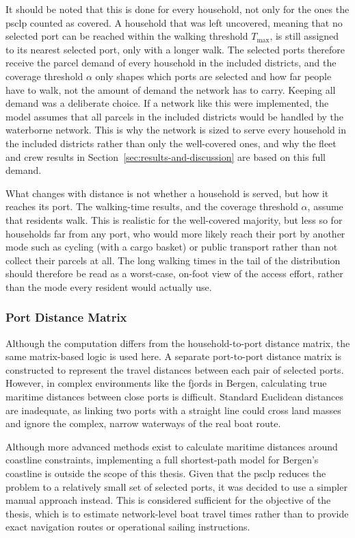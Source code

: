 \documentclass[12pt]{article}
\begin{document}
It should be noted that this is done for every household, not only for the ones the \ac{psclp} counted as covered. A household that was left uncovered, meaning that no selected port can be reached within the walking threshold \(T_{\max}\), is still assigned to its nearest selected port, only with a longer walk. The selected ports therefore receive the parcel demand of every household in the included districts, and the coverage threshold \(\alpha\) only shapes which ports are selected and how far people have to walk, not the amount of demand the network has to carry. Keeping all demand was a deliberate choice. If a network like this were implemented, the model assumes that all parcels in the included districts would be handled by the waterborne network. This is why the network is sized to serve every household in the included districts rather than only the well-covered ones, and why the fleet and crew results in Section~\ref{sec:results-and-discussion} are based on this full demand.

What changes with distance is not whether a household is served, but how it reaches its port. The walking-time results, and the coverage threshold \(\alpha\), assume that residents walk. This is realistic for the well-covered majority, but less so for households far from any port, who would more likely reach their port by another mode such as cycling (with a cargo basket) or public transport rather than not collect their parcels at all. The long walking times in the tail of the distribution should therefore be read as a worst-case, on-foot view of the access effort, rather than the mode every resident would actually use.

\subsubsection{Port Distance Matrix}
\label{subsubsec:port-distance-matrix}

Although the computation differs from the household-to-port distance matrix, the same matrix-based logic is used here. A separate port-to-port distance matrix is constructed to represent the travel distances between each pair of selected ports. However, in complex environments like the fjords in Bergen, calculating true maritime distances between close ports is difficult. Standard Euclidean distances are inadequate, as linking two ports with a straight line could cross land masses and ignore the complex, narrow waterways of the real boat route.

Although more advanced methods exist to calculate maritime distances around coastline constraints, implementing a full shortest-path model for Bergen's coastline is outside the scope of this thesis. Given that the \ac{psclp} reduces the problem to a relatively small set of selected ports, it was decided to use a simpler manual approach instead. This is considered sufficient for the objective of the thesis, which is to estimate network-level boat travel times rather than to provide exact navigation routes or operational sailing instructions.
\end{document}
